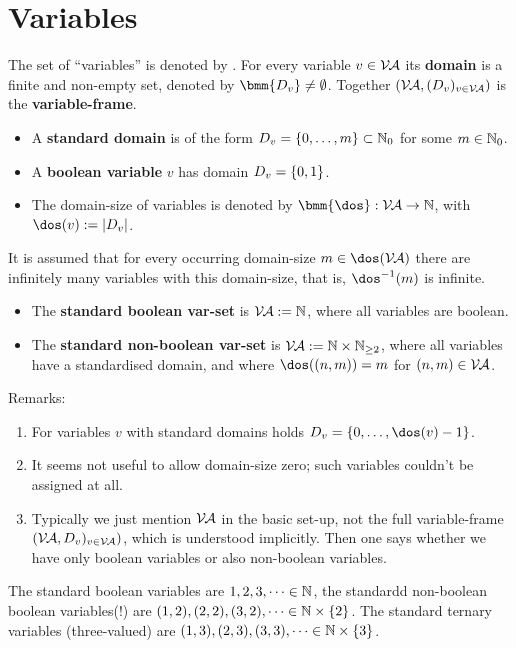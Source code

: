 \documentclass[]{book}
\begin{document}
\section{Variables}
\label{sec:Variables}

\begin{defi}\label{def:var}
      The set of ``variables'' is denoted by \bmm{\Va}. For every variable $v \in \mathcal{V\hspace{-0.1em}A}$ its \textbf{domain} is a finite and non-empty set, denoted by 
	  $\bmm{D_v} \ne \es$. Together $(\mathcal{V\hspace{-0.1em}A}, (D_v)_{v \in \mathcal{V\hspace{-0.1em}A}})$ is the \textbf{variable-frame}.
      \begin{itemize}
            \item A \textbf{standard domain} is of the form $D_v = \{ 0, \dots, m \} \subset \mathbb{N}_0$ for some $m \in \mathbb{N}_0$.
            \item A \textbf{boolean variable} $v$ has domain $D_v = \{ 0,1 \}$.
            \item The domain-size of variables is denoted by $\bmm{\dos}: \Va \ra \NN$, with $\dos(v) := \abs{D_v}$.
      \end{itemize}
      It is assumed that for every occurring domain-size $m \in \dos(\Va)$ there are infinitely many variables with this domain-size, that is, $\dos^{-1}(m)$ is infinite.
      \begin{itemize}
            \item The \textbf{standard boolean var-set} is $\mathcal{V\hspace{-0.1em}A} := \mathbb{N}$, where all variables are boolean.
            \item The \textbf{standard non-boolean var-set} is $\mathcal{V\hspace{-0.1em}A} := \mathbb{N} \times \mathbb{N}_{\ge2}$, where all variables have a standardised domain, and where 
			$\dos((n,m)) = m$ for $(n,m) \in \mathcal{V\hspace{-0.1em}A}$.
      \end{itemize}
\end{defi}
Remarks:
\begin{enumerate}
      \item For variables $v$ with standard domains holds $D_v = \tb{0}{\dos(v)-1}$.
      \item It seems not useful to allow domain-size zero; such variables couldn't be assigned at all.
      \item Typically we just mention $\mathcal{V\hspace{-0.1em}A}$ in the basic set-up, not the full variable-frame $(\mathcal{V\hspace{-0.1em}A},
      D_v)_{v \in \mathcal{V\hspace{-0.1em}A}})$, which is understood implicitly. Then one says whether we have only boolean variables or also non-boolean variables.
\end{enumerate}

\begin{examp}\label{exp:var}
      The standard boolean variables are $1, 2, 3, \dots \in \mathbb{N}$, the standardd non-boolean boolean variables(!) are $(1,2), (2,2), (3,2), \dots \in \mathbb{N} \times \{ 2 \}$. 
	  The standard ternary variables (three-valued) are $(1,3), (2,3), (3,3), \dots \in \mathbb{N} \times \{ 3 \}$.
\end{examp}
\end{document}
